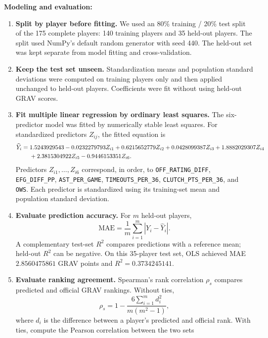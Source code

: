 \documentclass[11pt]{article}
\begin{document}
\textbf{Modeling and evaluation:}
\begin{enumerate}
\item \textbf{Split by player before fitting.} We used an 80\% training /
20\% test split of the 175 complete players: 140 training players and
35 held-out players. The split used NumPy's default random generator with
seed 440. The held-out set was kept separate from model fitting and
cross-validation.
\item \textbf{Keep the test set unseen.} Standardization means and
population standard deviations were computed on training players only
and then applied unchanged to held-out players. Coefficients were fit
without using held-out GRAV scores.
\item \textbf{Fit multiple linear regression by ordinary least squares.}
The six-predictor model was fitted by numerically stable least squares.
For standardized predictors $Z_{ij}$, the fitted equation is
\begin{align}
\widehat Y_i={}&1.5243929543
-0.0232279793Z_{i1}
+0.6215652779Z_{i2}
+0.0428099387Z_{i3}
+1.8882029307Z_{i4}\notag\\
&+2.3815304922Z_{i5}
-0.9446153351Z_{i6}.
\label{eq:fitted-ols}
\end{align}
Predictors $Z_{i1},\ldots,Z_{i6}$ correspond, in order, to
\texttt{OFF\_RATING\_DIFF}, \texttt{EFG\_DIFF\_PP},
\texttt{AST\_PER\_GAME}, \texttt{TIMEOUTS\_PER\_36},
\texttt{CLUTCH\_PTS\_PER\_36}, and \texttt{OWS}. Each predictor is
standardized using its training-set mean and population standard deviation.
\item \textbf{Evaluate prediction accuracy.} For $m$ held-out players,
\begin{equation}
 \mathrm{MAE}=\frac{1}{m}\sum_{i=1}^{m}|Y_i-\widehat Y_i|.
 \label{eq:mae}
\end{equation}
A complementary test-set $R^2$ compares predictions with a reference
mean; held-out $R^2$ can be negative. On this 35-player test set, OLS
achieved MAE $2.8560475861$ GRAV points and $R^2=0.3734245141$.
\item \textbf{Evaluate ranking agreement.} Spearman's rank correlation
$\rho_s$ compares predicted and official GRAV rankings. Without ties,
\begin{equation}
\rho_s=1-\frac{6\sum_{i=1}^{m}d_i^2}{m(m^2-1)},
\label{eq:spearman}
\end{equation}
where $d_i$ is the difference between a player's predicted and official
rank. With ties, compute the Pearson correlation between the two sets

\end{enumerate}
\end{document}
